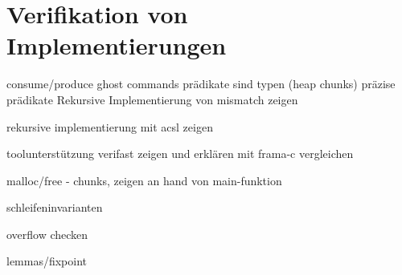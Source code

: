﻿\section{Verifikation von Implementierungen}

consume/produce
ghost commands
prädikate sind typen (heap chunks)
präzise prädikate
Rekursive Implementierung von mismatch zeigen

rekursive implementierung mit acsl zeigen

toolunterstützung verifast zeigen und erklären
mit frama-c vergleichen

malloc/free - chunks, zeigen an hand von main-funktion

schleifeninvarianten

overflow checken

lemmas/fixpoint


